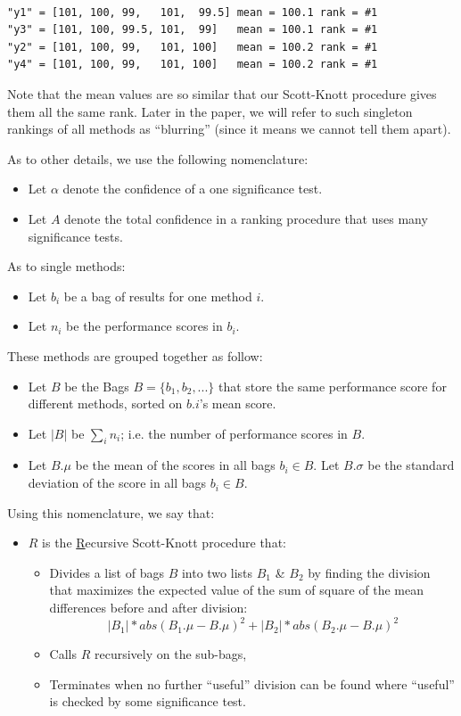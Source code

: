 \documentclass{sig-alternate}
\newcommand{\bi}{\begin{itemize}}
\newcommand{\ei}{\end{itemize}}
\begin{document}
\begin{minipage}{0.7\linewidth}
\scriptsize
\begin{verbatim}

"y1" = [101, 100, 99,   101,  99.5] mean = 100.1 rank = #1
"y3" = [101, 100, 99.5, 101,  99]   mean = 100.1 rank = #1
"y2" = [101, 100, 99,   101, 100]   mean = 100.2 rank = #1
"y4" = [101, 100, 99,   101, 100]   mean = 100.2 rank = #1

\end{verbatim}
\end{minipage}

\noindent
Note that the  mean values are so similar that our Scott-Knott procedure gives them all
the same rank. 
Later in the paper, we will refer to such
 singleton rankings of all methods as  ``blurring''
(since it means we cannot tell them apart).

As to other details,
we use the following
 nomenclature:
\bi
\item Let $\alpha$ denote the confidence of a one significance test.
\item Let $A$ denote the total confidence in a ranking procedure that uses many significance tests.
\ei
As to single methods:
\bi
\item Let $b_i$ be a bag of results for one method $i$.
\item Let $n_i$  be the performance scores in $b_i$.
\ei
These methods are grouped together as follow:
\bi
\item Let $B$ be the Bags $B=\{b_1,b_2,...\}$ that store
the same performance score for different methods, sorted on $b.i$'s mean score.
\item Let 
$|B|$ be  $\sum_in_i$; i.e. the number of performance scores in $B$. 
\item Let
$B.\mu$ be the mean of the scores in all bags $b_i \in B$.
Let 
$B.\sigma$ be the standard deviation of the score in all bags $b_i \in B$.
\ei
Using this nomenclature, we say that:
\bi
\item $R$ is the \underline{R}ecursive Scott-Knott procedure that:
\bi
\item
Divides a  list of bags $B$ into two lists $B_1$ \& $B_2$ by finding the division
that maximizes the expected value of the sum of square of the mean differences  
before and after division:
\[|B_1|*abs(B_1.\mu - B.\mu)^2 + |B_2|*abs(B_2.\mu - B.\mu)^2 \]
\item
Calls $R$ recursively on the sub-bags,
\item Terminates when no further ``useful'' division can
be found where ``useful'' is checked by some significance test.
\ei
\ei
\end{document}
